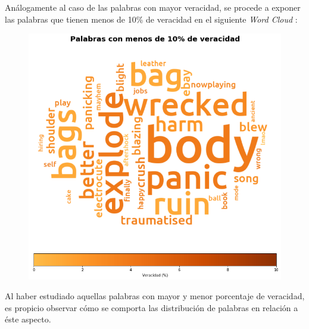 \documentclass[titlepage,a4paper]{article}
\begin{document}
    Análogamente al caso de las palabras con mayor veracidad, se procede a exponer las palabras que tienen menos de 10\% de veracidad en el   siguiente \textit{Word Cloud} :
    
     \begin{figure}[H]
    \centering
    \includegraphics[width=1\textwidth]{graficos/Analisis Lexico Grafico/palabras_con_menos_de_10_de_veracidad.png}
    \caption{} 
    \end{figure}
    
    Al haber estudiado aquellas palabras con mayor y menor porcentaje de veracidad, es propicio observar cómo se comporta las distribución de palabras en relación a éste aspecto.
    
\end{document}
